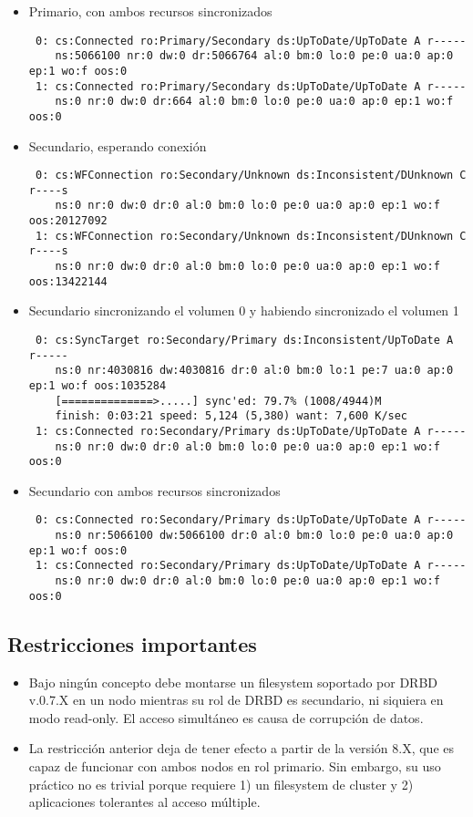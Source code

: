 \begin{itemize}
	\item Primario, con ambos recursos sincronizados
	\begin{lstlisting}
 0: cs:Connected ro:Primary/Secondary ds:UpToDate/UpToDate A r-----
    ns:5066100 nr:0 dw:0 dr:5066764 al:0 bm:0 lo:0 pe:0 ua:0 ap:0 ep:1 wo:f oos:0
 1: cs:Connected ro:Primary/Secondary ds:UpToDate/UpToDate A r-----
    ns:0 nr:0 dw:0 dr:664 al:0 bm:0 lo:0 pe:0 ua:0 ap:0 ep:1 wo:f oos:0
	\end{lstlisting}
	\item Secundario, esperando conexión 
\begin{lstlisting}
 0: cs:WFConnection ro:Secondary/Unknown ds:Inconsistent/DUnknown C r----s
    ns:0 nr:0 dw:0 dr:0 al:0 bm:0 lo:0 pe:0 ua:0 ap:0 ep:1 wo:f oos:20127092
 1: cs:WFConnection ro:Secondary/Unknown ds:Inconsistent/DUnknown C r----s
    ns:0 nr:0 dw:0 dr:0 al:0 bm:0 lo:0 pe:0 ua:0 ap:0 ep:1 wo:f oos:13422144
\end{lstlisting}
	\item Secundario sincronizando el volumen 0 y habiendo sincronizado el volumen 1
\begin{lstlisting}
 0: cs:SyncTarget ro:Secondary/Primary ds:Inconsistent/UpToDate A r-----
    ns:0 nr:4030816 dw:4030816 dr:0 al:0 bm:0 lo:1 pe:7 ua:0 ap:0 ep:1 wo:f oos:1035284
	[==============>.....] sync'ed: 79.7% (1008/4944)M
	finish: 0:03:21 speed: 5,124 (5,380) want: 7,600 K/sec
 1: cs:Connected ro:Secondary/Primary ds:UpToDate/UpToDate A r-----
    ns:0 nr:0 dw:0 dr:0 al:0 bm:0 lo:0 pe:0 ua:0 ap:0 ep:1 wo:f oos:0
\end{lstlisting}
	\item Secundario con ambos recursos sincronizados
	\begin{lstlisting}
 0: cs:Connected ro:Secondary/Primary ds:UpToDate/UpToDate A r-----
    ns:0 nr:5066100 dw:5066100 dr:0 al:0 bm:0 lo:0 pe:0 ua:0 ap:0 ep:1 wo:f oos:0
 1: cs:Connected ro:Secondary/Primary ds:UpToDate/UpToDate A r-----
    ns:0 nr:0 dw:0 dr:0 al:0 bm:0 lo:0 pe:0 ua:0 ap:0 ep:1 wo:f oos:0
	\end{lstlisting}
\end{itemize}






\subsection{Restricciones importantes}
\begin{itemize}
	\item Bajo ningún concepto debe montarse un filesystem soportado por DRBD v.0.7.X en un nodo mientras su rol de DRBD es secundario, ni siquiera en modo read-only. El acceso simultáneo es causa de corrupción de datos. 
	\item La restricción anterior deja de tener efecto a partir de la versión 8.X, que es capaz de funcionar con ambos nodos en rol primario. Sin embargo, su uso práctico no es trivial porque requiere 1) un filesystem de cluster y 2) aplicaciones tolerantes al acceso múltiple.
\end{itemize} 


